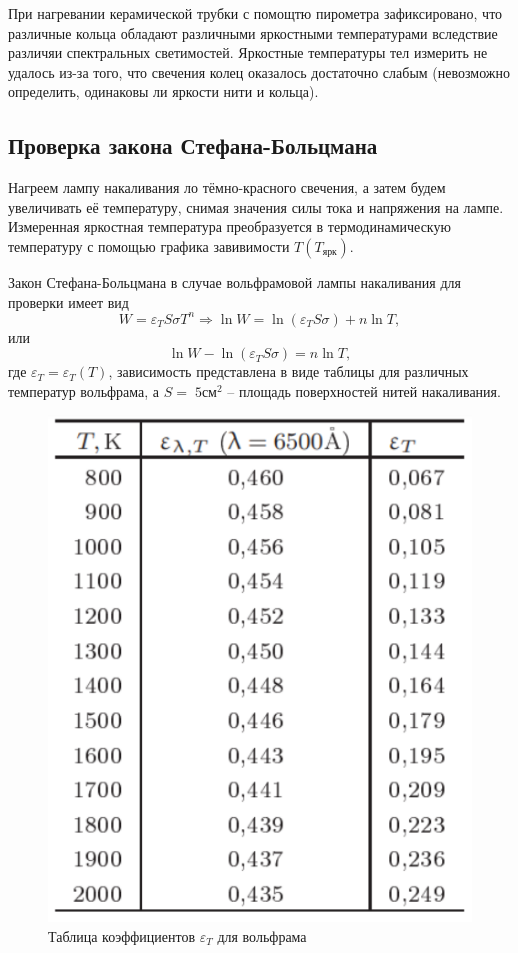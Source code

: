 \documentclass[a4paper, 12pt]{article}%
\begin{document}
    При нагревании керамической трубки с помощтю пирометра зафиксировано, что различные кольца обладают различными яркостными температурами вследствие различяи спектральных светимостей. Яркостные температуры тел измерить не удалось из-за того, что свечения колец оказалось достаточно слабым (невозможно определить, одинаковы ли яркости нити и кольца).

\subsection{Проверка закона Стефана-Больцмана}

    Нагреем лампу накаливания ло тёмно-красного свечения, а затем будем увеличивать её температуру, снимая значения силы тока и напряжения на лампе. Измеренная яркостная температура преобразуется в термодинамическую температуру с помощью графика завивимости $T(T_{\text{ярк}})$. 

    Закон Стефана-Больцмана в случае вольфрамовой лампы накаливания для проверки имеет вид
    \begin{equation}
        W = \varepsilon_T S \sigma T^n \Rightarrow \ln W = \ln (\varepsilon_T S \sigma) + n \ln T,
    \end{equation}
    или
    \begin{equation}
        \ln W - \ln (\varepsilon_T S \sigma) = n \ln T,
    \end{equation}
    где $\varepsilon_T = \varepsilon_T (T)$, зависимость представлена в виде таблицы для различных температур вольфрама, а $S = \; 5 \text{см}^2$ -- площадь поверхностей нитей накаливания.

    \begin{figure}[h!]
        \centering
        \includegraphics[width = 6.5 cm]{wolfram_coef.png}
        \caption{Таблица коэффициентов $\varepsilon_T$ для вольфрама}
        \label{}
    \end{figure}
\end{document}
